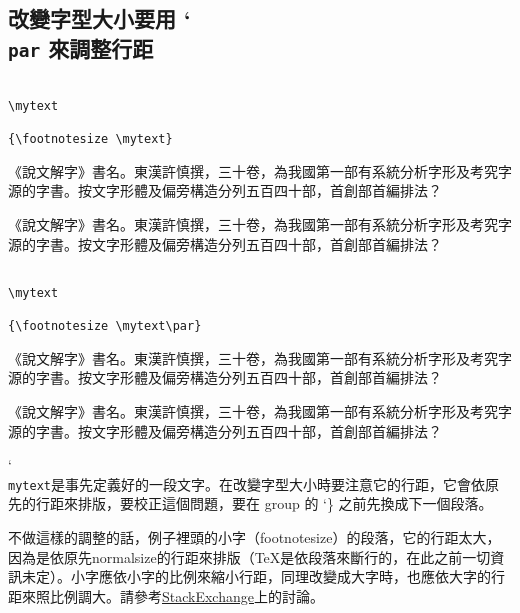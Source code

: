 \subsection{改變字型大小要用 \char`\\\texttt{par} 來調整行距}

\def\mytext{%
《說文解字》書名。東漢許慎撰，三十卷，為我國第一部有系統分析字形及考究字源的字書。按文字形體及偏旁構造分列五百四十部，首創部首編排法？}

\begin{Wrong}
\begin{verbatim}

\mytext

{\footnotesize \mytext}

\end{verbatim}
\mytext

{\footnotesize \mytext}
\end{Wrong}

\begin{Right}
\begin{verbatim}

\mytext

{\footnotesize \mytext\par}

\end{verbatim}
\mytext

{\footnotesize \mytext\par}
\end{Right}
\char`\\\texttt{mytext}是事先定義好的一段文字。在改變字型大小時要注意它的行距，它會依原先的行距來排版，要校正這個問題，要在 group 的 \char`\} 之前先換成下一個段落。

不做這樣的調整的話，例子裡頭的小字（footnotesize）的段落，它的行距太大，因為是依原先normalsize的行距來排版（\TeX 是依段落來斷行的，在此之前一切資訊未定）。小字應依小字的比例來縮小行距，同理改變成大字時，也應依大字的行距來照比例調大。請參考\href{https://tex.stackexchange.com/questions/444039/why-do-i-have-to-use-par-if-i-change-font-size-withing-a-group-scope}{\textsf{StackExchange}}上的討論。

\marginpar{\back}
